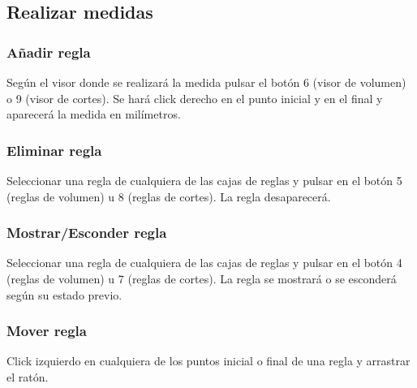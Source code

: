 \subsection{Realizar medidas}

\subsubsection{Añadir regla}

Según el visor donde se realizará la medida pulsar el botón 6 (visor de volumen) o 9 (visor de cortes). Se hará click derecho en el punto inicial y en el final y aparecerá la medida en milímetros.

\subsubsection{Eliminar regla}

Seleccionar una regla de cualquiera de las cajas de reglas y pulsar en el botón 5 (reglas de volumen) u 8 (reglas de cortes). La regla desaparecerá.

\subsubsection{Mostrar/Esconder regla}

Seleccionar una regla de cualquiera de las cajas de reglas y pulsar en el botón 4 (reglas de volumen) u 7 (reglas de cortes). La regla se mostrará o se esconderá según su estado previo.

\subsubsection{Mover regla}

Click izquierdo en cualquiera de los puntos inicial o final de una regla y arrastrar el ratón.